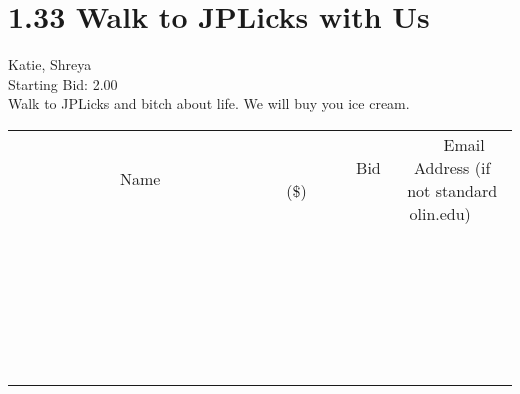 \documentclass[11pt]{article}
\begin{document}
					\section*{1.33 Walk to JPLicks with Us}
					Katie, Shreya \\
					Starting Bid: 2.00 \\
					Walk to JPLicks and bitch about life. We will buy you ice cream. \\
					[6ex]
					\begin{tabular}{c c c}
						~~~~~~~~~~~~~Name~~~~~~~~~~~~~ & ~~~~~~~~~Bid (\$)~~~~~~~~~ & ~~~Email Address (if not standard olin.edu)~~~ \\
				
 & & \\
\hline
 & & \\
\hline
 & & \\
\hline
 & & \\
\hline
 & & \\
\hline
 & & \\
\hline
 & & \\
\hline
 & & \\
\hline
 & & \\
\hline
 & & \\
\hline
 & & \\
\hline
 & & \\
\hline
 & & \\
\hline
 & & \\
\hline
 & & \\
\hline
 & & \\
\hline
 & & \\
\hline
 & & \\
\hline
 & & \\
\hline
 & & \\
\hline
 & & \\
\hline
 & & \\
\hline
 & & \\
\hline
 & & \\
\hline
 & & \\
\hline
 & & \\
\hline
					\end{tabular}
					\clearpage
				
\end{document}
